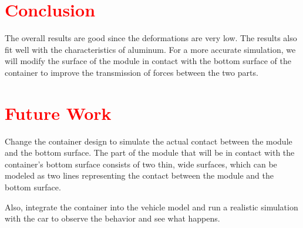 \documentclass[a4paper,12pt]{article}
\begin{document}
\vspace*{2cm}

\section{\textcolor{red}{Conclusion}}

\label{sec:Conclusion}

The overall results are good since the deformations are very low. The results also fit well with the characteristics of aluminum. For a more accurate simulation, we will modify the surface of the module in contact with the bottom surface of the container to improve the transmission of forces between the two parts.




\section{\textcolor{red} {Future Work}}
\label{sec:Future Work}
Change the container design to simulate the actual contact between the module and the bottom surface. The part of the module that will be in contact with the container’s bottom surface consists of two thin, wide surfaces, which can be modeled as two lines representing the contact between the module and the bottom surface.

Also, integrate the container into the vehicle model and run a realistic simulation with the car to observe the behavior and see what happens.

%
%
\end{document}
